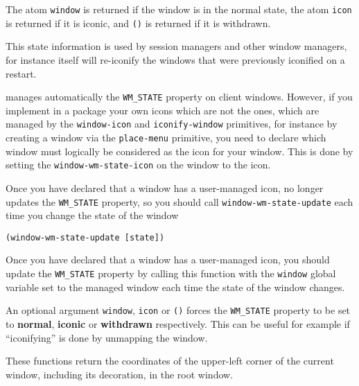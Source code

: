 The atom \verb"window" is returned if the window is in the normal
state, the atom \verb"icon" is returned if it is iconic, and \verb|()|
is returned if it is withdrawn.

This state information is used by session managers and other window
managers, for instance {\GWM} itself will re-iconify the windows that were
previously iconified on a restart.

        

{\GWM} manages automatically the \verb"WM_STATE" property on client windows.
However, if you implement in a {\WOOL} package your own icons which are not
the {\GWM} ones, which are managed by the 
\verb"window-icon" and \verb"iconify-window"
primitives, for instance by creating a window via the \verb"place-menu"
primitive, you need to declare which window must logically be
considered as the icon for your window. This is done by setting the
\verb"window-wm-state-icon" on the window to the icon.

Once you have declared that a window has a user-managed icon, {\GWM} no
longer updates the \verb"WM_STATE" property, so you should call
\verb"window-wm-state-update" each time you change the state of the window


{\usagefont\begin{verbatim}
(window-wm-state-update [state])
\end{verbatim}}\usageupspace

Once you have declared that a window has a user-managed icon, you should
update the \verb"WM_STATE" property by calling this function with the
\verb"window" global variable set to the managed window each time the state
of the window changes.

An optional argument \verb"window", \verb"icon" or \verb|()| forces
the \verb"WM_STATE" property to be set to {\bf normal}, {\bf iconic}
or {\bf withdrawn} respectively. This can be useful for example if
``iconifying'' is done by unmapping the window.

        

These functions return the coordinates of the upper-left corner of the
current window, including its decoration, in the root window. 

